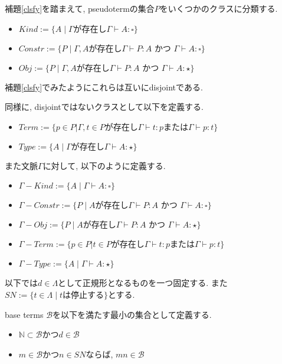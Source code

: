 \documentclass[12pt]{ltjsarticle}
\begin{document}
\begin{defn}
補題\ref{clsfy}を踏まえて, pseudotermの集合$P$をいくつかのクラスに分類する.
 \begin{itemize}
  \item $Kind := \{ A \mid \Gamma \text{が存在し} \Gamma \vdash A \colon {\square}\}$
  \item $Constr := \{ P \mid \Gamma, A \text{が存在し} \Gamma \vdash P \colon A \text{ かつ } \Gamma \vdash A \colon {\square}\}$
  \item $Obj := \{ P \mid \Gamma, A \text{が存在し} \Gamma \vdash P \colon A \text{ かつ } \Gamma \vdash A \colon {\star}\}$
 \end{itemize}
 補題\ref{clsfy}でみたようにこれらは互いにdisjointである.
 
 同様に, disjointではないクラスとして以下を定義する.
 \begin{itemize}
  \item $Term := \{p \in P | \Gamma, t \in P\text {が存在し} \Gamma \vdash t : p \text{または} \Gamma \vdash p : t \}$
  \item $Type := \{ A \mid \Gamma \text{が存在し} \Gamma \vdash A \colon {\star}\}$
 \end{itemize}
 
また文脈$\Gamma$に対して, 以下のように定義する.
 \begin{itemize}
  \item $\Gamma-Kind := \{ A \mid \Gamma \vdash A \colon {\square}\}$
  \item $\Gamma-Constr := \{ P \mid A \text{が存在し} \Gamma \vdash P \colon A \text{ かつ } \Gamma \vdash A \colon {\square}\}$
  \item $\Gamma-Obj := \{ P \mid A \text{が存在し} \Gamma \vdash P \colon A \text{ かつ } \Gamma \vdash A \colon {\star}\}$
  \item $\Gamma-Term := \{p \in P | t \in P\text {が存在し} \Gamma \vdash t : p \text{または} \Gamma \vdash p : t \}$
  \item $\Gamma-Type := \{ A \mid \Gamma \vdash A \colon {\star}\}$
 \end{itemize}
\end{defn}

以下では$d \in \Lambda$として正規形となるものを一つ固定する. また$SN := \{ t \in \Lambda \mid t \text{は停止する}\}$とする.

\begin{defn}
 base terms $\mathcal{B}$を以下を満たす最小の集合として定義する.
 \begin{itemize}
  \item $\mathbb{N} \subset \mathcal{B}$かつ$d \in \mathcal{B}$
  \item $m \in \mathcal{B}$かつ$n \in SN$ならば, $mn \in \mathcal{B}$
 \end{itemize}
\end{defn}
\end{document}
